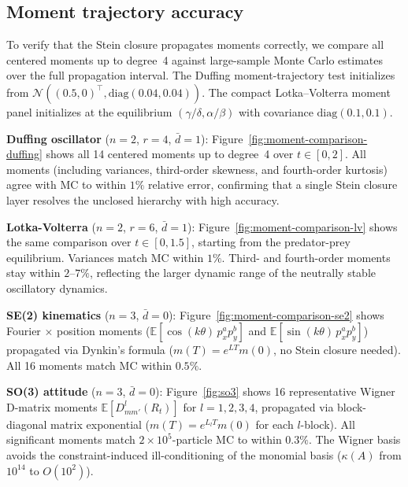 \documentclass{article}
\newcommand{\E}{\mathbb{E}}
\theoremstyle{definition}
\begin{document}
\subsection{Moment trajectory accuracy}
\label{app:moment-accuracy}

To verify that the Stein closure propagates moments correctly,
we compare all centered moments up to degree~4 against
large-sample Monte Carlo estimates over the full propagation interval.
The Duffing moment-trajectory test initializes from
$\mathcal{N}((0.5,0)^\top,\mathrm{diag}(0.04,0.04))$.
The compact Lotka--Volterra moment panel initializes at the equilibrium
$(\gamma/\delta,\alpha/\beta)$ with covariance $\mathrm{diag}(0.1,0.1)$.

\textbf{Duffing oscillator} ($n{=}2$, $r{=}4$, $\bar{d}{=}1$):
Figure~\ref{fig:moment-comparison-duffing} shows all 14 centered moments
up to degree~4 over $t \in [0, 2]$.
All moments (including variances, third-order skewness, and
fourth-order kurtosis) agree with MC to within $1\%$ relative error,
confirming that a single Stein closure layer resolves the unclosed
hierarchy with high accuracy.

\textbf{Lotka-Volterra} ($n{=}2$, $r{=}6$, $\bar{d}{=}1$):
Figure~\ref{fig:moment-comparison-lv} shows the same comparison
over $t \in [0, 1.5]$, starting from the predator-prey equilibrium.
Variances match MC within $1\%$. Third- and fourth-order moments
stay within $2$--$7\%$, reflecting the larger dynamic range
of the neutrally stable oscillatory dynamics.

\textbf{SE(2) kinematics} ($n{=}3$, $\bar{d}{=}0$):
Figure~\ref{fig:moment-comparison-se2} shows Fourier $\times$ position
moments ($\E[\cos(k\theta)\, p_x^a p_y^b]$ and
$\E[\sin(k\theta)\, p_x^a p_y^b]$) propagated via Dynkin's formula
($m(T) = e^{LT}m(0)$, no Stein closure needed).
All 16 moments match MC within $0.5\%$.

\textbf{SO(3) attitude} ($n{=}3$, $\bar{d}{=}0$):
Figure~\ref{fig:so3} shows 16 representative Wigner D-matrix moments
$\E[D^l_{mm'}(R_t)]$ for $l = 1, 2, 3, 4$,
propagated via block-diagonal matrix exponential ($m(T) = e^{L_l T}m(0)$
for each $l$-block).
All significant moments match $2 \times 10^5$-particle MC to within $0.3\%$.
The Wigner basis avoids the constraint-induced ill-conditioning
of the monomial basis ($\kappa(A)$ from $10^{14}$ to $O(10^2)$).
\end{document}
